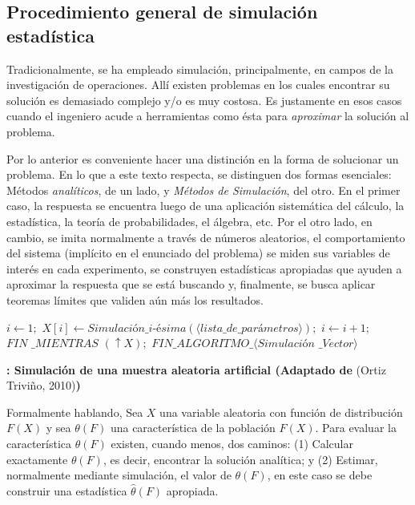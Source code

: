\subsection{Procedimiento general de simulación estadística}

Tradicionalmente, se ha empleado simulación, principalmente, en campos de la investigación de operaciones.  Allí existen problemas en los cuales encontrar su solución es demasiado complejo y/o es muy costosa. Es justamente en esos casos cuando el ingeniero acude a herramientas como ésta para \textit{aproximar} la solución al problema.

Por lo anterior es conveniente hacer una distinción en la forma de solucionar un problema.  En lo que a este texto respecta, se distinguen dos formas esenciales: Métodos \textit{analíticos}, de un lado, y \textit{Métodos de Simulación}, del otro.  En el primer caso, la respuesta se encuentra luego de una aplicación sistemática del cálculo, la estadística, la teoría de probabilidades, el álgebra, etc.  Por el otro lado, en cambio,  se imita normalmente a través de números aleatorios, el comportamiento del sistema (implícito en el enunciado del problema) se miden sus variables de interés en cada experimento, se construyen estadísticas apropiadas que ayuden a aproximar la respuesta que se está buscando y, finalmente,  se busca aplicar  teoremas límites que  validen aún más los resultados.

\algrenewcommand{}

\begin{algorithm} 
\begin{algorithmic}[0] 
    \Loop
        \State $i \gets 1;$
            \Loop
                \State $X[i] \gets \textit{Simulación\_i-ésima}(\langle \textit{lista\_de\_parámetros}\rangle);$
                \State $i \gets i + 1;$
            \EndLoop \State $\textit{FIN \_MIENTRAS}$
        \EndWhile
        \State \Return $(\uparrow X);$
    \EndLoop \State $\textit{FIN\_ALGORITMO} \_\langle\textit{Simulación\ \_Vector}\rangle$
\EndFunction
\end{algorithmic}
\caption{\!\!\textbf{: Simulación de  una muestra aleatoria artificial (Adaptado de} (Ortiz Triviño, 2010)\textbf{)}}\label{algo_2}
\end{algorithm}

Formalmente hablando, Sea $X$ una variable aleatoria con función de distribución $F(X)$ y sea $\theta(F)$ una característica de la población $F(X)$. Para evaluar la característica  $\theta(F)$ existen, cuando menos, dos caminos: (1) Calcular exactamente  $\theta(F)$, es decir, encontrar la solución analítica;  y  (2) Estimar, normalmente mediante simulación, el valor de  $\theta(F)$, en este caso se debe construir una estadística  $\hat{\theta}(F)$ apropiada.

